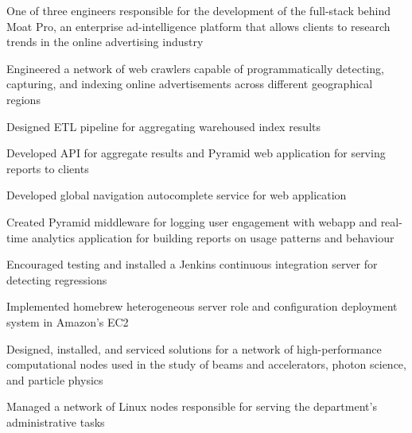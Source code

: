 \documentclass[]{deedy-resume-openfont}
\begin{document}
    \begin{tightemize}
        \item
            One of three engineers responsible for the development of the
            full-stack behind Moat Pro, an enterprise ad-intelligence platform
            that allows clients to research trends in the online advertising
            industry
        \item
            Engineered a network of web crawlers capable of programmatically
            detecting, capturing, and indexing online advertisements across
            different geographical regions
        \item
            Designed ETL pipeline for aggregating warehoused index results
        \item
            Developed API for aggregate results and Pyramid web application for
            serving reports to clients
        \item
            Developed global navigation autocomplete service for web application
        \item
            Created Pyramid middleware for logging user engagement with
            webapp and real-time analytics application for building reports on
            usage patterns and behaviour
        \item
            Encouraged testing and installed a Jenkins continuous integration
            server for detecting regressions
        \item
            Implemented homebrew heterogeneous server role and configuration
            deployment system in Amazon’s EC2
    \end{tightemize}
\sectionsep

    \begin{tightemize}
        \item
            Designed, installed, and serviced solutions for a network of
            high-performance computational nodes used in the study of beams
            and accelerators, photon science, and particle physics
        \item
            Managed a network of Linux nodes responsible for serving the
            department's administrative tasks
    \end{tightemize}
\sectionsep
\end{document}
